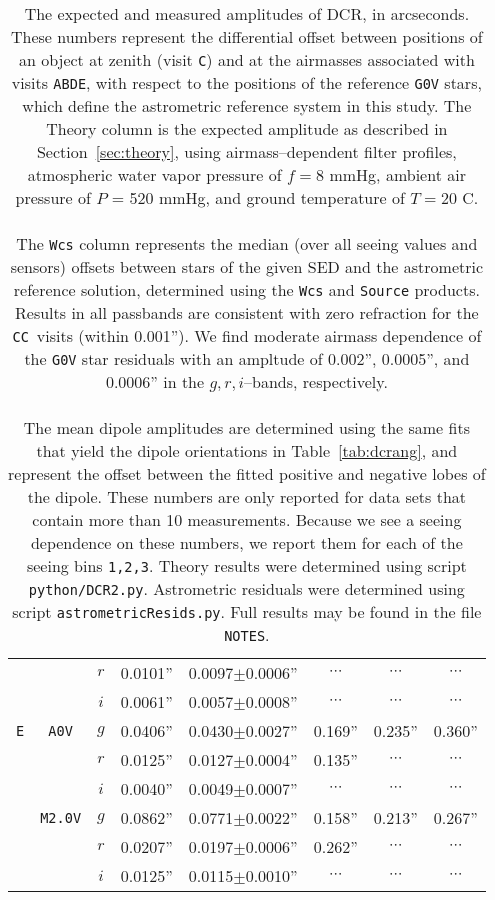 \documentclass[prd, nofootinbib, floatfix, 11pt, tightenlines, times]{article}
\def\A{{\tt A}}
\def\B{{\tt B}}
\def\C{{\tt C}}
\def\D{{\tt D}}
\def\E{{\tt E}}
\begin{document}
\begin{table}
\begin{tabular}{cccccccc}
   &             & $r$ & 0.0101'' & 0.0097$\pm$0.0006'' & $\cdots$ & $\cdots$ & $\cdots$ \\ 
   &             & $i$ & 0.0061'' & 0.0057$\pm$0.0008'' & $\cdots$ & $\cdots$ & $\cdots$ \\
\hline
\E & {\tt A0V}   & $g$ & 0.0406'' & 0.0430$\pm$0.0027'' & 0.169''  & 0.235''  & 0.360''  \\
   &             & $r$ & 0.0125'' & 0.0127$\pm$0.0004'' & 0.135''  & $\cdots$ & $\cdots$ \\
   &             & $i$ & 0.0040'' & 0.0049$\pm$0.0007'' & $\cdots$ & $\cdots$ & $\cdots$ \\
   & {\tt M2.0V} & $g$ & 0.0862'' & 0.0771$\pm$0.0022'' & 0.158''  & 0.213''  & 0.267''  \\
   &             & $r$ & 0.0207'' & 0.0197$\pm$0.0006'' & 0.262''  & $\cdots$ & $\cdots$ \\
   &             & $i$ & 0.0125'' & 0.0115$\pm$0.0010'' & $\cdots$ & $\cdots$ & $\cdots$ \\
\end{tabular}
\caption[So I can have 2 paragraphs]{The expected and measured
  amplitudes of DCR, in arcseconds.  These numbers represent the
  differential offset between positions of an object at zenith (visit
  \C) and at the airmasses associated with visits \A\B\D\E, with
  respect to the positions of the reference {\tt G0V} stars, which
  define the astrometric reference system in this study.  The Theory
  column is the expected amplitude as described in
  Section~\ref{sec:theory}, using airmass--dependent filter profiles,
  atmospheric water vapor pressure of $f=8$ mmHg, ambient air pressure
  of $P$ = 520 mmHg, and ground temperature of $T=20$ C.  \\ ~ \\ The
  {\tt Wcs} column represents the median (over all seeing values and
  sensors) offsets between stars of the given SED and the astrometric
  reference solution, determined using the {\tt Wcs} and {\tt Source}
  products.  Results in all passbands are consistent with zero
  refraction for the \C\C\ visits (within 0.001'').  We find moderate
  airmass dependence of the {\tt G0V} star residuals with an ampltude
  of 0.002'', 0.0005'', and 0.0006'' in the $g,r,i$--bands,
  respectively.  \\ ~ \\ The mean dipole amplitudes are determined
  using the same fits that yield the dipole orientations in
  Table~\ref{tab:dcrang}, and represent the offset between the fitted
  positive and negative lobes of the dipole.  These numbers are only
  reported for data sets that contain more than 10 measurements.
  Because we see a seeing dependence on these numbers, we report them
  for each of the seeing bins {\tt 1,2,3}.  Theory results were
  determined using script {\tt python/DCR2.py}.  Astrometric residuals
  were determined using script {\tt astrometricResids.py}.  Full
  results may be found in the file {\tt NOTES}.}
\label{tab:dcramp}
\end{table}
\end{document}
